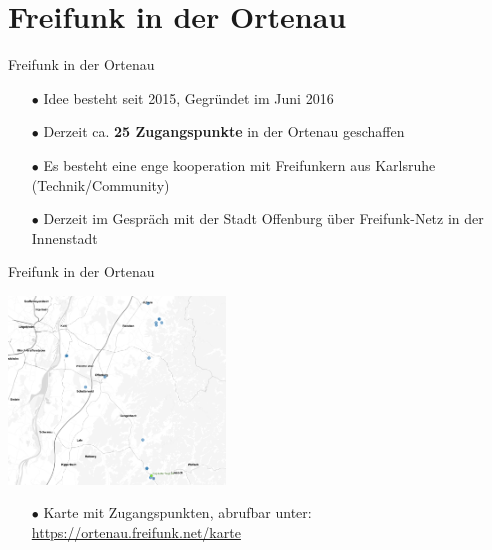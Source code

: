\documentclass[10pt]{beamer}
\begin{document}
  \section{Freifunk in der Ortenau}
  \begin{frame}{Freifunk in der Ortenau}
        \begin{itemize}
          \item[\textcolor{freifunkpink}{\Large$\bullet$}] Idee besteht seit 2015, Gegründet im Juni 2016
          \item[\textcolor{freifunkpink}{\Large$\bullet$}] Derzeit ca. \textbf{25 Zugangspunkte} in der Ortenau geschaffen
          \item[\textcolor{freifunkpink}{\Large$\bullet$}] Es besteht eine enge kooperation mit Freifunkern aus Karlsruhe (Technik/Community)
          \item[\textcolor{freifunkpink}{\Large$\bullet$}] Derzeit im Gespräch mit der Stadt Offenburg über Freifunk-Netz in der Innenstadt
        \end{itemize}
  \end{frame}

  \begin{frame}{Freifunk in der Ortenau}
    \begin{center}
        \includegraphics[height=5cm]{images/knotenkarte}\\
        \begin{itemize}
           \item[\textcolor{freifunkpink}{\Large$\bullet$}] Karte mit Zugangspunkten, abrufbar unter: \url{https://ortenau.freifunk.net/karte}
        \end{itemize}
    \end{center}
  \end{frame}
\end{document}
